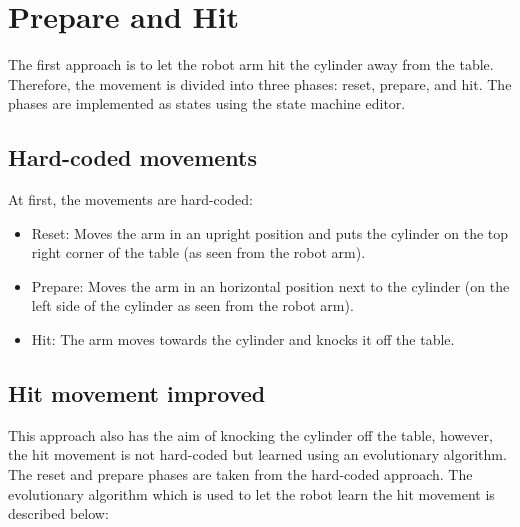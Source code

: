 \documentclass[10pt,twocolumn,letterpaper]{article}
\begin{document}
\section{Prepare and Hit} \label{sec:PrepareHit}

The first approach is to let the robot arm hit the cylinder away from the table. Therefore, the movement is divided into three phases: reset, prepare, and hit. The phases are implemented as states using the state machine editor.

\subsection{Hard-coded movements}

At first, the movements are hard-coded:

\begin{itemize}
\item Reset: Moves the arm in an upright position and puts the cylinder on the top right corner of the table (as seen from the robot arm).
\item Prepare: Moves the arm in an horizontal position next to the cylinder (on the left side of the cylinder as seen from the robot arm).
\item Hit: The arm moves towards the cylinder and knocks it off the table.
\end{itemize}

\subsection{Hit movement improved} 

This approach also has the aim of knocking the cylinder off the table, however, the hit movement is not hard-coded but learned using an evolutionary algorithm. The reset and prepare phases are taken from the hard-coded approach.
The evolutionary algorithm which is used to let the robot learn the hit movement is described below: 
\end{document}
